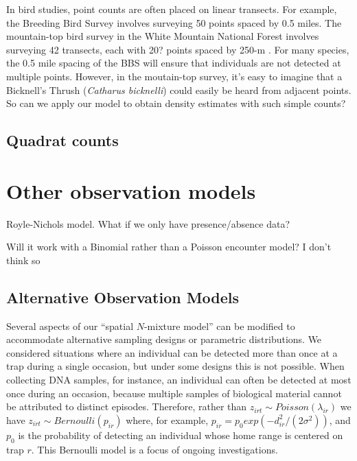 In bird studies, point counts are often placed on linear transects. For
example, the Breeding Bird Survey involves surveying 50 points spaced
by 0.5 miles. The mountain-top bird survey in the White Mountain
National Forest involves surveying 42 transects, each with 20? points
spaced by 250-m \citep{king_etal:2008}. For many species, the 0.5 mile
spacing of the BBS will ensure that individuals are not detected at
multiple points. However, in the moutain-top survey, it's easy to
imagine that a Bicknell's Thrush (\emph{Catharus bicknelli}) could
easily be heard from adjacent points. So can we apply our model to
obtain density estimates with such simple counts?



\subsection{Quadrat counts}




\section{Other observation models}

Royle-Nichols model. What if we only have presence/absence data?

Will it work with a Binomial rather than a Poisson encounter model? I
don't think so










\subsection{Alternative Observation Models}
\label{Sect.alt-obsmods}

Several aspects of our ``spatial $N$-mixture model'' can be modified
to accommodate
alternative sampling designs or parametric distributions.
We considered situations where an individual can be detected more than
once at a trap during a single occasion, but under some designs this
is not possible. When collecting DNA samples, for instance, an
individual can often be detected at most once during an
occasion, because multiple samples of biological material cannot be
attributed
to distinct episodes. Therefore, rather than $z_{irt} \sim Poisson(\lambda_{ir})$
we have $z_{irt} \sim Bernoulli(p_{ir})$ where, for example,  $p_{ir} = p_0
exp(-d_{ir}^2/(2\sigma^2))$, and $p_0$ is the probability of
detecting an individual whose home range is centered on trap $r$. This
Bernoulli model is a focus of ongoing investigations.

